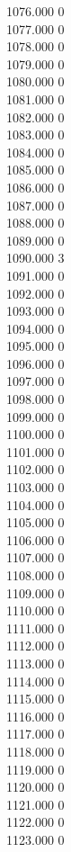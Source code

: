 { 1076.000	0 \\
 1077.000	0 \\
 1078.000	0 \\
 1079.000	0 \\
 1080.000	0 \\
 1081.000	0 \\
 1082.000	0 \\
 1083.000	0 \\
 1084.000	0 \\
 1085.000	0 \\
 1086.000	0 \\
 1087.000	0 \\
 1088.000	0 \\
 1089.000	0 \\
 1090.000	3 \\
 1091.000	0 \\
 1092.000	0 \\
 1093.000	0 \\
 1094.000	0 \\
 1095.000	0 \\
 1096.000	0 \\
 1097.000	0 \\
 1098.000	0 \\
 1099.000	0 \\
 1100.000	0 \\
 1101.000	0 \\
 1102.000	0 \\
 1103.000	0 \\
 1104.000	0 \\
 1105.000	0 \\
 1106.000	0 \\
 1107.000	0 \\
 1108.000	0 \\
 1109.000	0 \\
 1110.000	0 \\
 1111.000	0 \\
 1112.000	0 \\
 1113.000	0 \\
 1114.000	0 \\
 1115.000	0 \\
 1116.000	0 \\
 1117.000	0 \\
 1118.000	0 \\
 1119.000	0 \\
 1120.000	0 \\
 1121.000	0 \\
 1122.000	0 \\
 1123.000	0 \\
}
